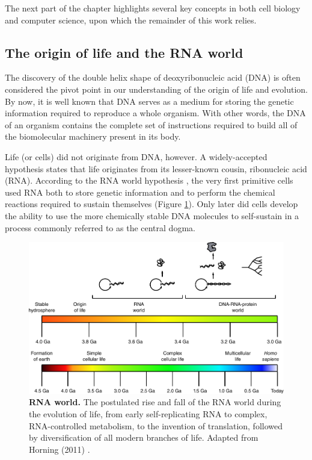 The next part of the chapter highlights several key concepts in both cell biology and computer science, upon which the remainder of this work relies.

\subsection{The origin of life and the RNA world}
The discovery of the double helix shape of deoxyribonucleic acid (DNA) \cite{watson_molecularstructurenucleic_1953} is often considered the pivot point in our understanding of the origin of life and evolution. By now, it is well known that DNA serves as a medium for storing the genetic information required to reproduce a whole organism. With other words, the DNA of an organism contains the complete set of instructions required to build all of the biomolecular machinery present in its body. 

Life (or cells) did not originate from DNA, however. A widely-accepted hypothesis states that life originates from its lesser-known cousin, ribonucleic acid (RNA). According to the RNA world hypothesis \cite{alberts_rnaworldorigins_2002}, the very first primitive cells used RNA both to store genetic information and to perform the chemical reactions required to sustain themselves (Figure \ref{fig:rnaworld}). Only later did cells develop the ability to use the more chemically stable DNA molecules to self-sustain in a process commonly referred to as the central dogma.

\begin{figure}[htb!]
	\centering
	\includegraphics[width=.8\linewidth]{fig/rnaworld}
	\caption{
		\textbf{RNA world.} The postulated rise and fall of the RNA world during the evolution of life, from early self-replicating RNA to complex, RNA-controlled metabolism, to the invention of translation, followed by diversification of all modern branches of life. Adapted from Horning (2011) \cite{horning_rnaworld_2011}.
	}
	\label{fig:rnaworld}
\end{figure}


